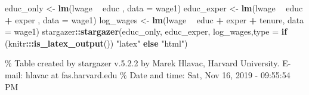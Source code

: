 \documentclass[]{book}
\newenvironment{Shaded}{\begin{snugshade}}{\end{snugshade}}
\newcommand{\KeywordTok}[1]{\textcolor[rgb]{0.13,0.29,0.53}{\textbf{#1}}}
\newcommand{\DataTypeTok}[1]{\textcolor[rgb]{0.13,0.29,0.53}{#1}}
\newcommand{\StringTok}[1]{\textcolor[rgb]{0.31,0.60,0.02}{#1}}
\newcommand{\ControlFlowTok}[1]{\textcolor[rgb]{0.13,0.29,0.53}{\textbf{#1}}}
\newcommand{\OperatorTok}[1]{\textcolor[rgb]{0.81,0.36,0.00}{\textbf{#1}}}
\newcommand{\NormalTok}[1]{#1}
\begin{document}
\begin{Shaded}
\begin{Highlighting}[]
\NormalTok{educ_only <-}\StringTok{ }\KeywordTok{lm}\NormalTok{(lwage }\OperatorTok{~}\StringTok{ }\NormalTok{educ                 , }\DataTypeTok{data =}\NormalTok{ wage1)}
\NormalTok{educ_exper <-}\StringTok{ }\KeywordTok{lm}\NormalTok{(lwage }\OperatorTok{~}\StringTok{ }\NormalTok{educ }\OperatorTok{+}\StringTok{ }\NormalTok{exper        , }\DataTypeTok{data =}\NormalTok{ wage1)}
\NormalTok{log_wages <-}\StringTok{ }\KeywordTok{lm}\NormalTok{(lwage }\OperatorTok{~}\StringTok{ }\NormalTok{educ }\OperatorTok{+}\StringTok{ }\NormalTok{exper }\OperatorTok{+}\StringTok{ }\NormalTok{tenure, }\DataTypeTok{data =}\NormalTok{ wage1)}
\NormalTok{stargazer}\OperatorTok{::}\KeywordTok{stargazer}\NormalTok{(educ_only, educ_exper, log_wages,}\DataTypeTok{type =} \ControlFlowTok{if}\NormalTok{ (knitr}\OperatorTok{:::}\KeywordTok{is_latex_output}\NormalTok{()) }\StringTok{"latex"} \ControlFlowTok{else} \StringTok{"html"}\NormalTok{)}
\end{Highlighting}
\end{Shaded}

\% Table created by stargazer v.5.2.2 by Marek Hlavac, Harvard
University. E-mail: hlavac at fas.harvard.edu \% Date and time: Sat, Nov
16, 2019 - 09:55:54 PM
\end{document}
